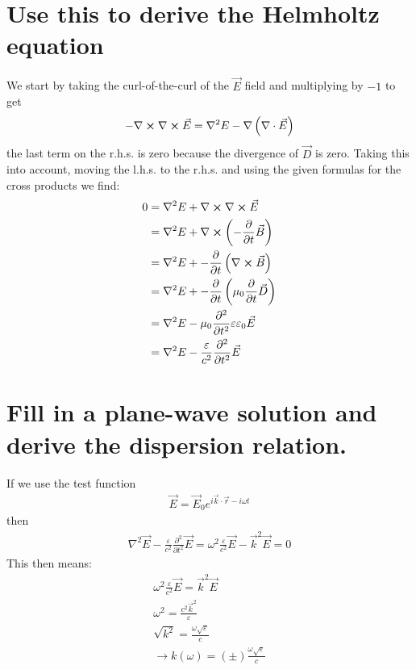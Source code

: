 \documentclass[12pt,a4paper,twosided]{article}
\begin{document}
\section{Use this to derive the Helmholtz equation}
  We start by taking the curl-of-the-curl of the $\vec E$ field and multiplying by $-1$ to get
  \begin{align}
    - \nabla \cross \nabla \cross \vec E = \nabla^2 E - \nabla\left(\nabla \cdot \vec E\right)
  \end{align}
  the last term on the r.h.s. is zero because the divergence of $\vec D$ is zero. Taking this into account, moving the l.h.s. to the r.h.s. and using the given formulas for the cross products we find:
  \begin{align}
    0 &= \nabla^2 E + \nabla \cross \nabla \cross \vec E\\
    &= \nabla^2 E + \nabla \cross \left(-\frac{\partial}{\partial t}\vec B\right)\\
    &= \nabla^2 E + -\frac{\partial}{\partial t}\left(\nabla \cross \vec B\right)\\
    &= \nabla^2 E + -\frac{\partial}{\partial t}\left(\mu_0\frac{\partial}{\partial t}\vec D\right)\\
    &= \nabla^2 E -\mu_0 \frac{\partial^2}{\partial t^2}\varepsilon \varepsilon_0 \vec E\\
    &= \nabla^2 E -\frac{\varepsilon}{c^2} \frac{\partial^2}{\partial t^2}\vec E
  \end{align}

\section{Fill in a plane-wave solution and derive the dispersion relation.}
If we use the test function
\begin{align}
 \vec E = \vec E_0 e^{i\vec k\cdot \vec r-i \omega t}
\end{align}
then
\begin{align}
  \nabla^2 \vec E  -\frac{\varepsilon}{c^2} \frac{\partial^2}{\partial t^2}\vec E = \omega^2 \frac{\varepsilon}{c^2} \vec E - \vec k^2 \vec E =0
\end{align}
This then means:
\begin{align}
  \omega^2 \frac{\varepsilon}{c^2} \vec E = \vec k^2 \vec E\\
  \omega^2 = \frac{c^2 \vec k^2}{\varepsilon}\\
  \sqrt{k^2} = \frac{\omega \sqrt{\varepsilon}}{c}\\
  \to k(\omega) = \left(\pm\right)\frac{\omega \sqrt{\varepsilon}}{c}
\end{align}
\end{document}
